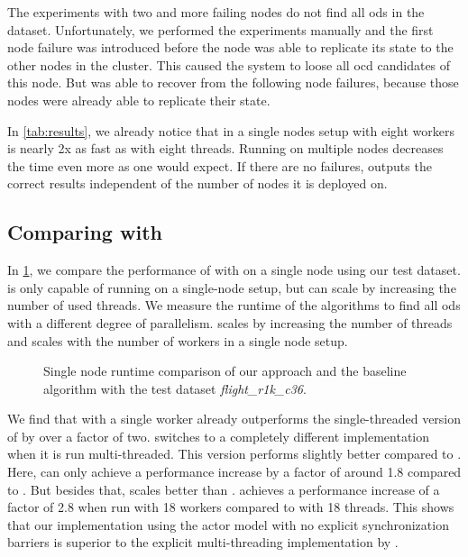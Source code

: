   The experiments with two and more failing nodes do not find all \glspl{od} in the dataset.
  Unfortunately, we performed the experiments manually and the first node failure was introduced before the node was able to replicate its state to the other nodes in the cluster.
  This caused the system to loose all \gls{ocd} candidates of this node.
  But \dodo{} was able to recover from the following node failures, because those nodes were already able to replicate their state.

  In \cref{tab:results}, we already notice that \dodo{} in a single nodes setup with eight workers is nearly 2x as fast as \ocddiscover{} with eight threads.
  Running \dodo{} on multiple nodes decreases the time even more as one would expect.
  If there are no failures, \dodo{} outputs the correct results independent of the number of nodes it is deployed on.
  
\subsection{Comparing with \ocddiscover{}}\label{sec:evaluation:comparison}

  In \cref{fig:runtime-vs-ocddiscover}, we compare the performance of \dodo{} with \ocddiscover{} on a single node using our test dataset.
  \ocddiscover{} is only capable of running on a single-node setup, but can scale by increasing the number of used threads.
  We measure the runtime of the algorithms to find all \glspl{od} with a different degree of parallelism.
  \ocddiscover{} scales by increasing the number of threads and \dodo{} scales with the number of workers in a single node setup.

  \begin{figure}
    \centering
%    
    
    \caption{Single node runtime comparison of our approach and the baseline algorithm \ocddiscover{} with the test dataset \textit{flight\_r1k\_c36}.}
    \label{fig:runtime-vs-ocddiscover}
  \end{figure}

  We find that \dodo{} with a single worker already outperforms the single-threaded version of \ocddiscover{} by over a factor of two.
  \ocddiscover{} switches to a completely different implementation when it is run multi-threaded.
  This version performs slightly better compared to \dodo{}.
  Here, \dodo{} can only achieve a performance increase by a factor of around 1.8 compared to \ocddiscover{}.
  But besides that, \dodo{} scales better than \ocddiscover{}.
  \dodo{} achieves a performance increase of a factor of 2.8 when run with 18 workers compared to \ocddiscover{} with 18 threads.
  This shows that our implementation using the actor model with no explicit synchronization barriers is superior to the explicit multi-threading implementation by \citeauthor{consonni}.

